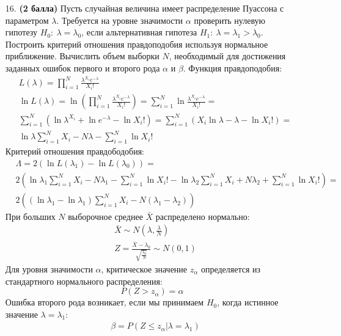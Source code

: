 \documentclass{assignment}
\begin{document}
\begin{enumerate}
    \item[16.] \textbf{(2 балла)} Пусть случайная величина имеет распределение Пуассона с параметром $\lambda$. Требуется на уровне значимости $\alpha$ проверить нулевую гипотезу $H_0:~ \lambda = \lambda_0$, если альтернативная гипотеза $H_1:~ \lambda = \lambda_1 > \lambda_0$. Построить критерий отношения правдоподобия используя нормальное приближение. Вычислить объем выборки $N$, необходимый для достижения заданных ошибок первого и второго рода $\alpha$ и $\beta$.
    \start
    Функция правдоподобия:
    \begin{align*}
        &L(\lambda) = \prod_{i=1}^{N} \frac{\lambda^{X_i}e^{-\lambda}}{X_i!} \\
        &\ln L(\lambda) = \ln (\prod_{i=1}^{N} \frac{\lambda^{X_i}e^{-\lambda}}{X_i!}) = \sum_{i=1}^{N} \ln\frac{\lambda^{X_i}e^{-\lambda}}{X_i!} = \\
        &\sum_{i=1}^{N} (\ln\lambda^{X_i} + \ln e^{-\lambda} - \ln X_i!) = \sum_{i=1}^{N} (X_i\ln\lambda -\lambda - \ln X_i!) = \\
        &\ln\lambda\sum_{i=1}^{N} X_i - N\lambda - \sum_{i=1}^{N}\ln X_i!
    \end{align*}
    Критерий отношения правдободобия:
    \begin{align*}
        &\Lambda = 2(\ln L(\lambda_1) - \ln L(\lambda_0)) = \\
        &2(\ln\lambda_1\sum_{i=1}^{N} X_i - N\lambda_1 - \sum_{i=1}^{N}\ln X_i! - \ln\lambda_2\sum_{i=1}^{N} X_i + N\lambda_2 + \sum_{i=1}^{N}\ln X_i!) = \\
        &2((\ln\lambda_1 - \ln\lambda_1)\sum_{i=1}^{N} X_i - N(\lambda_1 - \lambda_2))
    \end{align*}
    При больших $N$ выборочное среднее $\bar{X}$ распределено нормально:
    \begin{align*}
        &\bar{X} \sim N(\lambda, \frac{\lambda}{N}) \\
        &Z = \frac{\bar{X} - \lambda_0}{\sqrt{\frac{\lambda_0}{N}}} \sim N(0, 1)
    \end{align*}
    Для уровня значимости $\alpha$, критическое значение $z_{\alpha}$ определяется из стандартного нормального распределения:
    \begin{equation}
        P(Z > z_{\alpha}) = \alpha
    \end{equation}
    Ошибка второго рода возникает, если мы принимаем $H_0$, когда истинное значение $\lambda = \lambda_1$:
    \begin{align*}
        &\beta = P(Z \leq z_{\alpha}|\lambda = \lambda_1) \\

\end{align*}
\end{enumerate}
\end{document}
